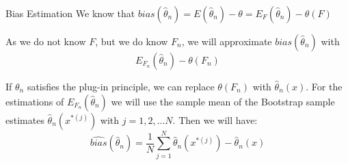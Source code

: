 \documentclass[8pt]{beamer}
\begin{document}
\begin{frame}{Bias Estimation}
We know that $bias\left(\widehat{\theta}_n\right)=E(\widehat{\theta}_n)-\theta=E_F(\widehat{\theta}_n)-\theta(F)$

\vspace{3mm}

As we do not know $F$, but we do know $F_n$, we will approximate $bias\left(\widehat{\theta}_n\right)$ with
\begin{equation*}
E_{F_n}(\widehat{\theta}_n)-\theta(F_n)
\end{equation*}

If $\theta_n$ satisfies the plug-in principle, we can replace $\theta(F_n)$ with $\widehat{\theta}_n(x)$. For the estimations of $E_{F_n}(\widehat{\theta}_n)$ we will use the sample mean of the Bootstrap sample estimates $\widehat{\theta}_n(x^{*(j)})$ with $j=1,2,...N$. Then we will have:
\begin{equation*}
\widehat{bias}\left(\widehat{\theta}_n\right) =  \frac{1}{N} \sum_{j=1}^N \widehat{\theta}_n\left(x^{*(j)}\right) - \widehat{\theta}_n(x)
\end{equation*}
\end{frame}
\end{document}
